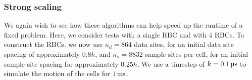 \subsubsection{Strong scaling}

We again wish to see how these algorithms can help speed up the runtime of
a fixed problem. Here, we consider tests with a single RBC and with 4 RBCs.
To construct the RBCs, we now use $n_d=864$ data sites, for an initial data
site spacing of approximately $0.8h$, and $n_s=8832$ sample sites per cell, for
an initial sample site spacing for approximately $0.25h$. We use a timestep of
$k=0.1\us$ to simulate the motion of the cells for $1\ms$.


